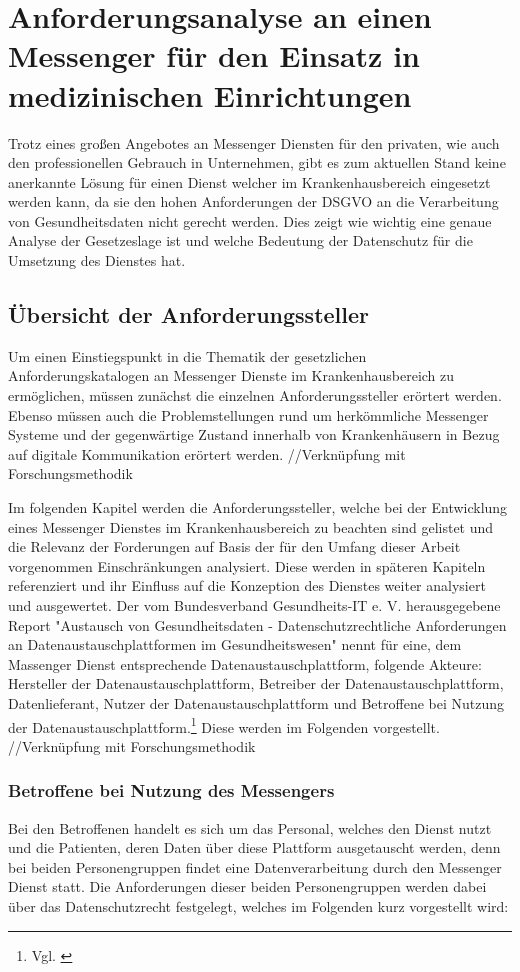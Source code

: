 \chapter{Anforderungsanalyse an einen Messenger für den Einsatz in medizinischen Einrichtungen}\label{chapter:ganforderungen}
Trotz eines großen Angebotes an Messenger Diensten für den privaten, wie auch den professionellen Gebrauch in Unternehmen, gibt es zum aktuellen Stand keine anerkannte Lösung für einen Dienst welcher im Krankenhausbereich eingesetzt werden kann, da sie den hohen Anforderungen der DSGVO an die Verarbeitung von Gesundheitsdaten nicht gerecht werden. Dies zeigt wie wichtig eine genaue Analyse der Gesetzeslage ist und welche Bedeutung der Datenschutz für die Umsetzung des Dienstes hat.

\section{Übersicht der Anforderungssteller}\label{chapter:hintergrund}
Um einen Einstiegspunkt in die Thematik der gesetzlichen Anforderungskatalogen an Messenger Dienste im Krankenhausbereich zu ermöglichen, müssen zunächst die einzelnen Anforderungssteller erörtert werden. Ebenso müssen auch die Problemstellungen rund um herkömmliche Messenger Systeme und der gegenwärtige Zustand innerhalb von Krankenhäusern in Bezug auf digitale Kommunikation erörtert werden.
//Verknüpfung mit Forschungsmethodik

Im folgenden Kapitel werden die Anforderungssteller, welche bei der Entwicklung eines Messenger Dienstes im Krankenhausbereich zu beachten sind gelistet und die Relevanz der Forderungen auf Basis der für den Umfang dieser Arbeit vorgenommen Einschränkungen analysiert. Diese werden in späteren Kapiteln referenziert und ihr Einfluss auf die Konzeption des Dienstes weiter analysiert und ausgewertet. Der vom Bundesverband Gesundheits-IT e. V. herausgegebene Report "Austausch von Gesundheitsdaten - Datenschutzrechtliche Anforderungen an Datenaustauschplattformen im Gesundheitswesen" nennt für eine, dem Massenger Dienst entsprechende Datenaustauschplattform, folgende Akteure: Hersteller der Datenaustauschplattform, Betreiber der Datenaustauschplattform, Datenlieferant, Nutzer der Datenaustauschplattform und Betroffene bei Nutzung der Datenaustauschplattform.\footnote{Vgl. \cite[S. 13]{Schubert2014}} Diese werden im Folgenden vorgestellt.
//Verknüpfung mit Forschungsmethodik

\subsection{Betroffene bei Nutzung des Messengers}\label{subsection:bbndd}
Bei den Betroffenen handelt es sich um das Personal, welches den Dienst nutzt und die Patienten, deren Daten über diese Plattform ausgetauscht werden, denn bei beiden Personengruppen findet eine Datenverarbeitung durch den Messenger Dienst statt. Die Anforderungen dieser beiden Personengruppen werden dabei über das Datenschutzrecht festgelegt, welches im Folgenden kurz vorgestellt wird:


